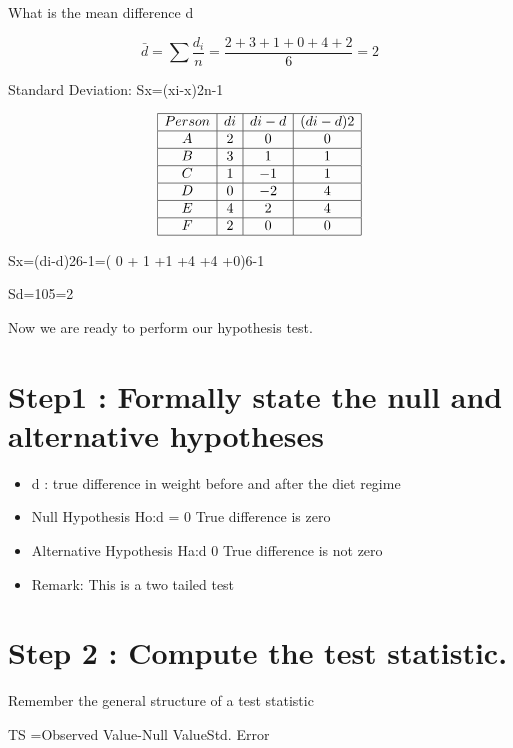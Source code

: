 

What is the mean difference d


\[\bar{d}=\sum \frac{d_i}{n}= \frac{2+3+1+0+4+2}{6}= 2\]



Standard Deviation:           Sx=(xi-x)2n-1      

\[
\begin{array}{|c|c|c|c|} \hline
Person&di&di-d&(di-d)2\\ \hline
A&2&0&0\\ \hline
B&3&1&1\\ \hline
C&1&-1&1\\ \hline
D&0&-2&4\\ \hline
E&4&2&4\\ \hline
F&2&0&0\\ \hline
\end{array} 
\]

Sx=(di-d)26-1=( 0 + 1 +1 +4 +4 +0)6-1

Sd=105=2 

Now we are ready to perform our hypothesis test.


\section{Step1 : Formally state the null and alternative hypotheses}

\begin{itemize}
\item d : true difference in weight before and after the diet regime 

\item Null Hypothesis               Ho:d = 0        True difference is zero

\item Alternative Hypothesis      Ha:d 0       True difference is not zero 

\item Remark: This is a two tailed test
\end{itemize}



\section{Step 2 : Compute the test statistic.}


Remember the general structure of a test statistic

TS =Observed Value-Null ValueStd. Error 



